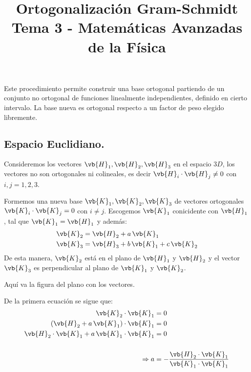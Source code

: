 
\usepackage[flushleft]{threeparttable}
\author{}
\title{Ortogonalización Gram-Schmidt \\ {\large Tema 3 - Matemáticas Avanzadas de la Física}\vspace{-3ex}}
\date{ }

\renewcommand\labelenumii{\theenumi.{\arabic{enumii}}}
\maketitle
\fontsize{14}{14}\selectfont
Este procedimiento permite construir una base ortogonal partiendo de un conjunto no ortogonal de funciones linealmente independientes, definido en cierto intervalo. La base nueva es ortogonal respecto a un factor de peso elegido libremente.
\subsection*{Espacio Euclidiano.}
Consideremos los vectores $\vb{H}_{1}, \vb{H}_{2}, \vb{H}_{3}$ en el espacio $3D$, los vectores no son ortogonales ni colineales, es decir $\vb{H}_{i} \cdot \vb{H}_{j} \neq 0$ con $i, j = 1, 2, 3$.
\par
Formemos una nueva base $\vb{K}_{1}, \vb{K}_{2}, \vb{K}_{3}$ de vectores ortogonales $\vb{K}_{i} \cdot \vb{K}_{j} = 0$ con $i \neq j$. Escogemos $\vb{K}_{1}$ conicidente con $\vb{H}_{1}$, tal que $\vb{K}_{1} = \vb{H}_{1}$ y además:
\begin{align*}
\vb{K}_{2} &= \vb{H}_{2} + a \, \vb{K}_{1} \\
\vb{K}_{3} &= \vb{H}_{3} + b \, \vb{K}_{1} + c \, \vb{K}_{2}
\end{align*}
De esta manera, $\vb{K}_{2}$ está en el plano de $\vb{H}_{1}$ y $\vb{H}_{2}$ y el vector $\vb{K}_{3}$ es perpendicular al plano de $\vb{K}_{1}$ y $\vb{K}_{2}$.
\par
Aquí va la figura del plano con los vectores.
\par
De la primera ecuación se sigue que:
\begin{align*}
\vb{K}_{2} \cdot \vb{K}_{1} &= 0  \\
(\vb{H}_{2} + a \, \vb{K}_{1}) \cdot \vb{K}_{1} &= 0 \\
\vb{H}_{2} \cdot \vb{K}_{1} + a \, \vb{K}_{1} \cdot \vb{K}_{1} &= 0 \\
\\
\Rightarrow a &= - \dfrac{\vb{H}_{2} \cdot \vb{K}_{1}}{\vb{K}_{1} \cdot \vb{K}_{1}}
\end{align*}
